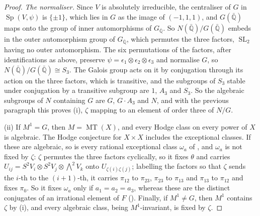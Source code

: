 \documentclass[11pt,reqno]{amsart}
\theoremstyle{plain}
\theoremstyle{definition}
\theoremstyle{remark}
\newcommand{\QQ}{\mathbb{Q}}
\DeclareMathOperator{\MT}{MT}
\DeclareMathOperator{\SL}{SL}
\DeclareMathOperator{\Sp}{Sp}
\begin{document}
\begin{proof}
\emph{The normaliser.} Since $V$ is absolutely irreducible, the centraliser of
$G$ in $\Sp(V,\psi)$ is $\{\pm1\}$, which lies in $G$ as the image of
$(-1,1,1)$, and $G(\bar{\QQ})$ maps onto the group of inner automorphisms of
$G_{\bar{\QQ}}$. So $N(\bar{\QQ})/G(\bar{\QQ})$ embeds in the outer
automorphism group of $G_{\bar{\QQ}}$, which permutes the three factors,
$\SL_{2}$ having no outer automorphism. The six permutations of the factors,
after identifications as above, preserve $\psi=\epsilon_{1}\otimes
\epsilon_{2}\otimes\epsilon_{3}$ and normalise $G$, so
$N(\bar{\QQ})/G(\bar{\QQ})\cong S_{3}$. The Galois group acts on it by
conjugation through its action on the three factors, which is transitive, and
the subgroups of $S_{3}$ stable under conjugation by a transitive subgroup are
$1$, $A_{3}$ and $S_{3}$. So the algebraic subgroups of $N$ containing $G$ are
$G$, $G\cdot A_{3}$ and $N$, and with the previous paragraph this proves (i),
$\zeta$ mapping to an element of order three of $N/G$.

(ii) If $M^{1}=G$, then $M=\MT(X)$, and every Hodge class on every power of
$X$ is algebraic. The Hodge conjecture for $X\times X$ includes the
exceptional classes. If these are algebraic, so is every rational exceptional
class $\omega_{a}$ of , and $\omega_{a}$ is not fixed by
$\zeta$: $\zeta$ permutes the three factors cyclically, so it fixes $\theta$
and carries $U_{ij}=S^{2}V_{i}\otimes S^{2}V_{j}\otimes{\textstyle\bigwedge^{2}}V_{k}$
onto $U_{\zeta(i)\zeta(j)}$; labelling the factors so that $\zeta$ sends the
$i$-th to the $(i+1)$-th, it carries $\pi_{12}$ to $\pi_{23}$, $\pi_{23}$ to
$\pi_{13}$ and $\pi_{13}$ to $\pi_{12}$ and fixes $\pi_{0}$. So it fixes
$\omega_{a}$ only if $a_{1}=a_{2}=a_{3}$, whereas these are the distinct
conjugates of an irrational element of $F$ (). Finally,
if $M^{1}\ne G$, then $M^{1}$ contains $\zeta$ by (i), and every algebraic
class, being $M^{1}$-invariant, is fixed by $\zeta$.


\end{proof}
\end{document}
